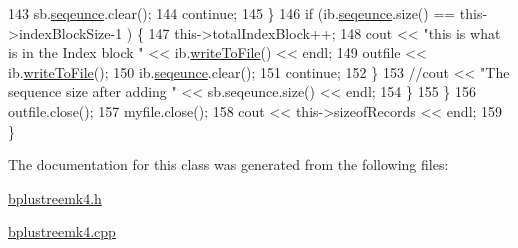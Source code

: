 \begin{DoxyCode}
143                 sb.\mbox{\hyperlink{structsequence_b_a4cb5526b3901d3a3348447bee4e7f623}{seqeunce}}.clear();
144                 \textcolor{keywordflow}{continue};
145             \}
146             \textcolor{keywordflow}{if} (ib.\mbox{\hyperlink{structindex_b_a2d8b28953bea6e6bdc221993ef60864a}{seqeunce}}.size() == this->indexBlockSize-1 ) \{
147                 this->totalIndexBlock++;
148                 cout << \textcolor{stringliteral}{"this is what is in the Index block "} << ib.\mbox{\hyperlink{structindex_b_a66ee0af70d7b1a08658aee4cd7efb0cc}{writeToFile}}() << endl;
149                 outfile << ib.\mbox{\hyperlink{structindex_b_a66ee0af70d7b1a08658aee4cd7efb0cc}{writeToFile}}();
150                 ib.\mbox{\hyperlink{structindex_b_a2d8b28953bea6e6bdc221993ef60864a}{seqeunce}}.clear();
151                 \textcolor{keywordflow}{continue};
152             \}
153             \textcolor{comment}{//cout << "The sequence size after adding " << sb.seqeunce.size() << endl;}
154         \}
155     \}
156     outfile.close();
157     myfile.close();
158     cout << this->sizeofRecords << endl;
159 \}
\end{DoxyCode}


The documentation for this class was generated from the following files\+:\begin{DoxyCompactItemize}
\item 
\mbox{\hyperlink{bplustreemk4_8h}{bplustreemk4.\+h}}\item 
\mbox{\hyperlink{bplustreemk4_8cpp}{bplustreemk4.\+cpp}}\end{DoxyCompactItemize}
